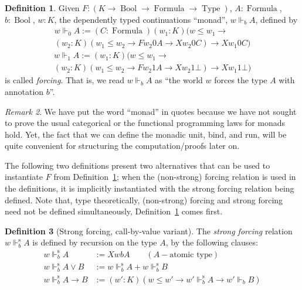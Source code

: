 \documentclass{eptcs}
\DeclareMathOperator{\Type}{Type}
\DeclareMathOperator{\Bool}{Bool}
\DeclareMathOperator{\Formula}{Formula}
\newcommand{\forces}[3]{{#1}\Vdash_{#2}{#3}}
\newcommand{\sforces}[3]{{#1}\Vdash^{\text{s}}_{#2}{#3}}
\theoremstyle{definition}
\newtheorem{definition}{Definition}[section]
\theoremstyle{plain}
\theoremstyle{remark}
\newtheorem{remark}[definition]{Remark}
\begin{document}
\begin{definition}\label{def:forcing}Given $F : (K\to\Bool\to\Formula\to\Type)$, $A:\Formula$, $b:\Bool$, $w:K$, the dependently typed continuations ``monad'', $\forces{w}{b}{A}$, defined by
\begin{multline*}
\forces{w}{0}{A} := (C:\Formula)(w_1:K)(w\le w_1 \to \\(w_2:K)(w_1\le w_2 \to F w_2 0 A \to X w_2 0 C) \to X w_1 0 C)
\end{multline*}
\begin{multline*}
\forces{w}{1}{A} := (w_1:K)(w\le w_1 \to \\(w_2:K)(w_1\le w_2 \to F w_2 1 A \to X w_2 1 \bot) \to X w_1 1 \bot)
\end{multline*}
is called \emph{forcing}. That is, we read $\forces{w}{b}{A}$ as ``the world $w$ forces the type $A$ with annotation $b$''. 
\end{definition}

\begin{remark}
  We have put the word ``monad'' in quotes because we have not sought to prove the usual categorical or the functional programming laws for monads hold. Yet, the fact that we can define the monadic unit, bind, and run, will be quite convenient for structuring the computation/proofs later on.
\end{remark}

The following two definitions present two alternatives that can be used to instantiate $F$ from Definition~\ref{def:forcing}; when the (non-strong) forcing relation is used in the definitions, it is implicitly instantiated with the strong forcing relation being defined. Note that, type theoretically, (non-strong) forcing and strong forcing need not be defined simultaneously, Definition~\ref{def:forcing} comes first.

\begin{definition}[Strong forcing, call-by-value variant] The \emph{strong forcing} relation $\sforces{w}{b}{A}$ is defined by recursion on the type $A$, by the following clauses:
\begin{align*}
\sforces{w}{b}{A} &:= X w b A \qquad (A -\text{atomic type})\\
\sforces{w}{b}{A\vee B} &:= \sforces{w}{b}{A} + \sforces{w}{b}{B}\\
\sforces{w}{b}{A\to B} &:= (w':K)(w\le w' \to \sforces{w'}{b}{A} \to \forces{w'}{b}{B})
\end{align*}
\end{definition}
\end{document}
